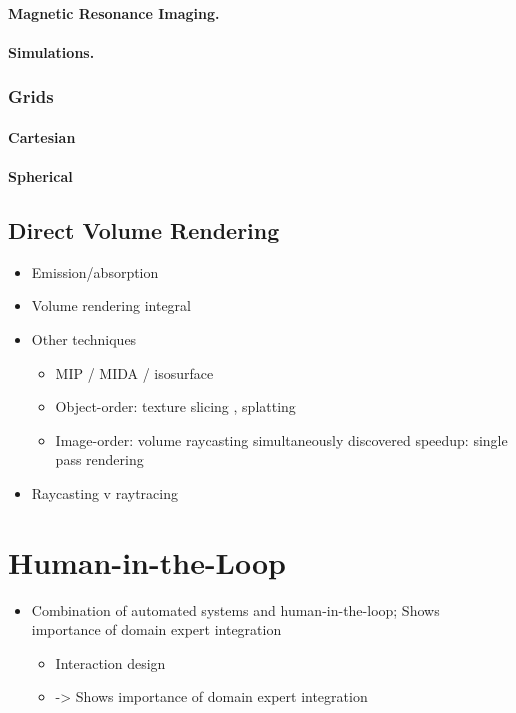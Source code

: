 \paragraph{Magnetic Resonance Imaging. }
\paragraph{Simulations. }

\subsubsection{Grids} \label{cha:intro:vp:da:grids}
\paragraph{Cartesian}

\paragraph{Spherical}

\subsection{Direct Volume Rendering} \label{cha:intro:vp:dvr}
\begin{itemize}
  \item Emission/absorption \cite{sabella1988rendering}
  \item Volume rendering integral \cite{max1995optical}
  \item Other techniques
  \begin{itemize}
    \item MIP / MIDA / isosurface
    \item Object-order: texture slicing \cite{westermann1998efficiently}, splatting \cite{westover1990footprint}
    \item Image-order: volume raycasting simultaneously discovered \cite{levoy1988display, drebin1988volume,sabella1988rendering} speedup: \cite{kruger2003acceleration} single pass rendering \cite{hadwiger2005real, stegmaier2005simple}
  \end{itemize}
  \item Raycasting v raytracing
\end{itemize}

\section{Human-in-the-Loop} \label{cha:intro:hitl}
\begin{itemize}
  \item Combination of automated systems and human-in-the-loop; Shows importance of domain expert integration
  \begin{itemize}
    \item Interaction design
    \item \cite{munzner2014visualization} \cite{van2005value} -> Shows importance of domain expert integration
  \end{itemize}
\end{itemize}
